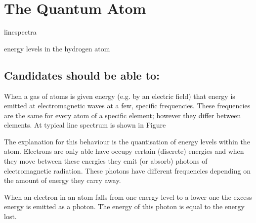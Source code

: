\documentclass[main.tex]{subfiles}
\begin{document}
\chapter{The Quantum Atom}
\begin{content}
\item linespectra
\item energy levels in the hydrogen atom
\end{content}
\section*{Candidates should be able to:}


When a gas of atoms is given energy (e.g. by an electric field) that energy is emitted at electromagnetic waves at a few, specific frequencies. These frequencies are the same for every atom of a specific element; however they differ between elements. At typical line spectrum is shown in Figure %

The explanation for this behaviour is the quantisation of energy levels within the atom. Electrons are only able have occupy certain (discrete) energies and when they move between these energies they emit (or absorb) photons of electromagnetic radiation. These photons have different frequencies depending on the amount of energy they carry away.


When an electron in an atom falls from one energy level to a lower one the excess energy is emitted as a photon. The energy of this photon is equal to the energy lost.
\end{document}
